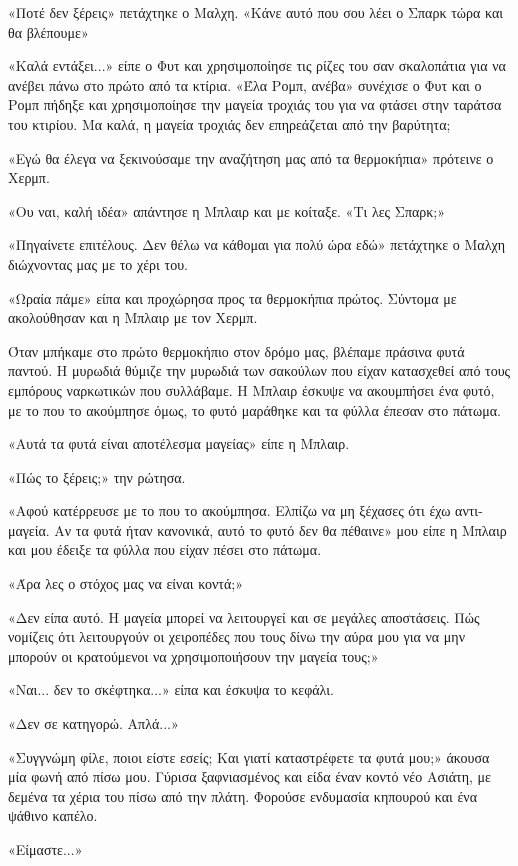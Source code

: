 \documentclass[12pt,twoside, openany]{book}
\begin{document}
«Ποτέ δεν ξέρεις» πετάχτηκε ο Μαλχη. «Κάνε αυτό που σου λέει ο Σπαρκ τώρα και θα βλέπουμε»

«Καλά εντάξει...» είπε ο Φυτ και χρησιμοποίησε τις ρίζες του σαν σκαλοπάτια για να ανέβει πάνω στο πρώτο από τα κτίρια. «Έλα Ρομπ, ανέβα» συνέχισε ο Φυτ και ο Ρομπ πήδηξε και χρησιμοποίησε την μαγεία τροχιάς του για να φτάσει στην ταράτσα του κτιρίου. Μα καλά, η μαγεία τροχιάς δεν επηρεάζεται από την βαρύτητα;

«Εγώ θα έλεγα να ξεκινούσαμε την αναζήτηση μας από τα θερμοκήπια» πρότεινε ο Χερμπ.

«Ου ναι, καλή ιδέα» απάντησε η Μπλαιρ και με κοίταξε. «Τι λες Σπαρκ;»

«Πηγαίνετε επιτέλους. Δεν θέλω να κάθομαι για πολύ ώρα εδώ» πετάχτηκε ο Μαλχη διώχνοντας μας με το χέρι του.

«Ωραία πάμε» είπα και προχώρησα προς τα θερμοκήπια πρώτος. Σύντομα με ακολούθησαν και η Μπλαιρ με τον Χερμπ.

Όταν μπήκαμε στο πρώτο θερμοκήπιο στον δρόμο μας, βλέπαμε πράσινα φυτά παντού. Η μυρωδιά θύμιζε την μυρωδιά των σακούλων που είχαν κατασχεθεί από τους εμπόρους ναρκωτικών που συλλάβαμε. Η Μπλαιρ έσκυψε να ακουμπήσει ένα φυτό, με το που το ακούμπησε όμως, το φυτό μαράθηκε και τα φύλλα έπεσαν στο πάτωμα.

«Αυτά τα φυτά είναι αποτέλεσμα μαγείας» είπε η Μπλαιρ.

«Πώς το ξέρεις;» την ρώτησα.

«Αφού κατέρρευσε με το που το ακούμπησα. Ελπίζω να μη ξέχασες ότι έχω αντι-μαγεία. Αν τα φυτά ήταν κανονικά, αυτό το φυτό δεν θα πέθαινε» μου είπε η Μπλαιρ και μου έδειξε τα φύλλα που είχαν πέσει στο πάτωμα.

«Άρα λες ο στόχος μας να είναι κοντά;»

«Δεν είπα αυτό. Η μαγεία μπορεί να λειτουργεί και σε μεγάλες αποστάσεις. Πώς νομίζεις ότι λειτουργούν οι χειροπέδες που τους δίνω την αύρα μου για να μην μπορούν οι κρατούμενοι να χρησιμοποιήσουν την μαγεία τους;»

«Ναι... δεν το σκέφτηκα...» είπα και έσκυψα το κεφάλι.

«Δεν σε κατηγορώ. Απλά...»

«Συγγνώμη φίλε, ποιοι είστε εσείς; Και γιατί καταστρέφετε τα φυτά μου;» άκουσα μία φωνή από πίσω μου. Γύρισα ξαφνιασμένος και είδα έναν κοντό νέο Ασιάτη, με δεμένα τα χέρια του πίσω από την πλάτη. Φορούσε ενδυμασία κηπουρού και ένα ψάθινο καπέλο. 

«Είμαστε...»
\end{document}
